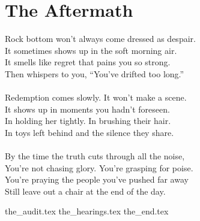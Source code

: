 \part{The Aftermath}

\vfill

\begin{flushright}
    \Large
    Rock bottom won’t always come dressed as despair.\\
    It sometimes shows up in the soft morning air.\\
    It smells like regret that pains you so strong.\\
    Then whispers to you, ``You’ve drifted too long.''\\
    \ \\
    Redemption comes slowly. It won’t make a scene.\\
    It shows up in moments you hadn’t foreseen.\\
    In holding her tightly. In brushing their hair.\\
    In toys left behind and the silence they share.\\
    \ \\
    By the time the truth cuts through all the noise,\\
    You’re not chasing glory. You’re grasping for poise.\\
    You're praying the people you've pushed far away\\
    Still leave out a chair at the end of the day.\\
\end{flushright}

{the_audit.tex}
{the_hearings.tex}
{the_end.tex}